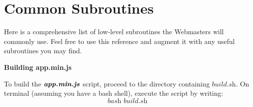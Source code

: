 \documentclass[a4paper]{article}
\begin{document}
\newpage
\section{Common Subroutines}

Here is a comprehensive list of low-level subroutines the Webmasters will commonly use. Feel free to use this reference and augment it with any useful subroutines you may find.

\begin{center}
\textbf{Building app.min.js}
\end{center}

To build the $\textbf{\textit{app.min.js}}$ script, proceed to the directory containing $\textit{build.sh}$. On terminal (assuming you have a bash shell), execute the script by writing:
$$\textit{bash build.sh}$$
\end{document}

